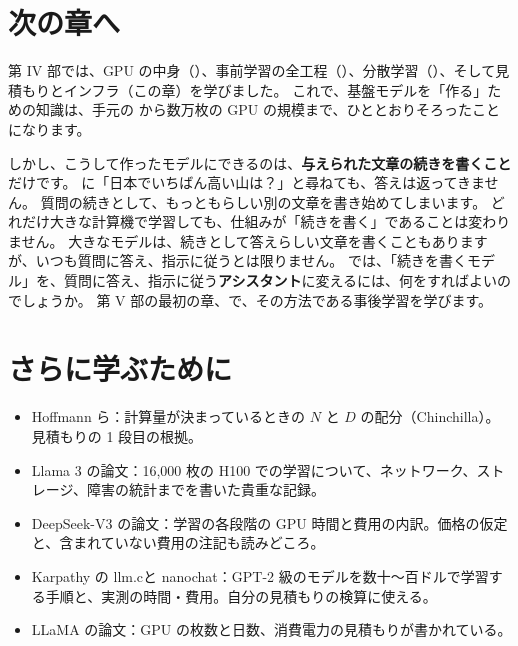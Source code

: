 \section*{次の章へ}

第 IV 部では、GPU の中身（）、事前学習の全工程（）、分散学習（）、そして見積もりとインフラ（この章）を学びました。
これで、基盤モデルを「作る」ための知識は、手元の  から数万枚の GPU の規模まで、ひととおりそろったことになります。

しかし、こうして作ったモデルにできるのは、\textbf{与えられた文章の続きを書くこと}だけです。
 に「日本でいちばん高い山は？」と尋ねても、答えは返ってきません。
質問の続きとして、もっともらしい別の文章を書き始めてしまいます。
どれだけ大きな計算機で学習しても、仕組みが「続きを書く」であることは変わりません。
大きなモデルは、続きとして答えらしい文章を書くこともありますが、いつも質問に答え、指示に従うとは限りません。
では、「続きを書くモデル」を、質問に答え、指示に従う\textbf{アシスタント}に変えるには、何をすればよいのでしょうか。
第 V 部の最初の章、で、その方法である事後学習を学びます。

\section*{さらに学ぶために}

\begin{itemize}
\item Hoffmann ら\cite{hoffmann2022training}：計算量が決まっているときの $N$ と $D$ の配分（Chinchilla）。見積もりの 1 段目の根拠。
\item Llama 3 の論文\cite{dubey2024llama3}：16,000 枚の H100 での学習について、ネットワーク、ストレージ、障害の統計までを書いた貴重な記録。
\item DeepSeek-V3 の論文\cite{liu2024deepseekv3}：学習の各段階の GPU 時間と費用の内訳。価格の仮定と、含まれていない費用の注記も読みどころ。
\item Karpathy の llm.c\cite{karpathy2024llmc}と nanochat\cite{karpathy2025nanochat}：GPT-2 級のモデルを数十〜百ドルで学習する手順と、実測の時間・費用。自分の見積もりの検算に使える。
\item LLaMA の論文\cite{touvron2023llama}：GPU の枚数と日数、消費電力の見積もりが書かれている。
\end{itemize}

